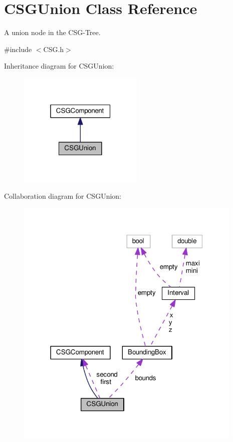 \hypertarget{classCSGUnion}{}\section{C\+S\+G\+Union Class Reference}
\label{classCSGUnion}


A union node in the C\+S\+G-\/\+Tree.  




{\ttfamily \#include $<$C\+S\+G.\+h$>$}



Inheritance diagram for C\+S\+G\+Union\+:\nopagebreak
\begin{figure}[H]
\begin{center}
\leavevmode
\includegraphics[width=169pt]{classCSGUnion__inherit__graph}
\end{center}
\end{figure}


Collaboration diagram for C\+S\+G\+Union\+:\nopagebreak
\begin{figure}[H]
\begin{center}
\leavevmode
\includegraphics[width=307pt]{classCSGUnion__coll__graph}
\end{center}
\end{figure}
